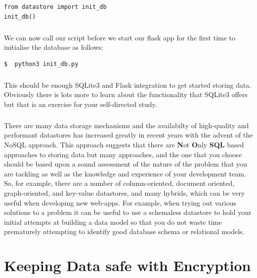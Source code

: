 \documentclass[12pt, a4paper, oneside]{book}
\begin{document}
{\begin{lstlisting}
from datastore import init_db
init_db()
\end{lstlisting}

\paragraph{} We can now call our script before we start our flask app for the first time to initialise the database as follows:

\begin{lstlisting}[style=DOS]
$  python3 init_db.py
\end{lstlisting}

\paragraph{} This should be enough SQLite3 and Flask integration to get started storing data. Obviously there is lots more to learn about the functionality that SQLite3 offers but that is an exercise for your self-directed study.

\paragraph{} There are many data storage mechanisms and the availabilty of high-quality and performant datastores has increased greatly in recent years with the advent of the NoSQL approach. This approach suggests that there are {\bf{N}}ot {\bf{O}}nly {\bf{SQL}} based approaches to storing data but many approaches, and the one that you choose should be based upon a sound assessment of the nature of the problem that you are tackling as well as the knowledge and experience of your development team. So, for example, there are a number of column-oriented, document oriented, graph-oriented, and key-value datastores, and many hybrids, which can be very useful when developing new web-apps. For example, when trying out various solutions to a problem it can be useful to use a schemaless datastore to hold your initial attempts at building a data model so that you do not waste time prematurely attempting to identify good database schema or relational models. 


\chapter{Keeping Data safe with Encryption}
\label{lab09}
}
\end{document}
